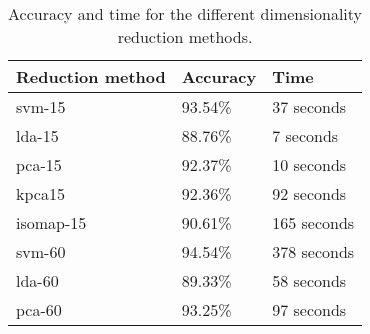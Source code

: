 \begin{table}
    \centering
    \begin{tabular}{lll}
        \hline
        Reduction method & Accuracy & Time \\
        \hline
        \gls{svm}-15 & 93.54\% & 37 seconds \\
        \gls{lda}-15 & 88.76\% & 7 seconds \\
        \gls{pca}-15 & 92.37\% & 10 seconds \\
        \gls{kpca}15 & 92.36\% & 92 seconds \\
        \gls{isomap}-15 & 90.61\% & 165 seconds \\
        \hline
        \gls{svm}-60 & 94.54\% & 378 seconds \\
        \gls{lda}-60 & 89.33\% & 58 seconds \\
        \gls{pca}-60 & 93.25\% & 97 seconds \\
        \hline
    \end{tabular}
    \caption{Accuracy and time for the different dimensionality reduction methods.}
    \label{tab:discussion-experiment-1-accuracy}
    \end{table}